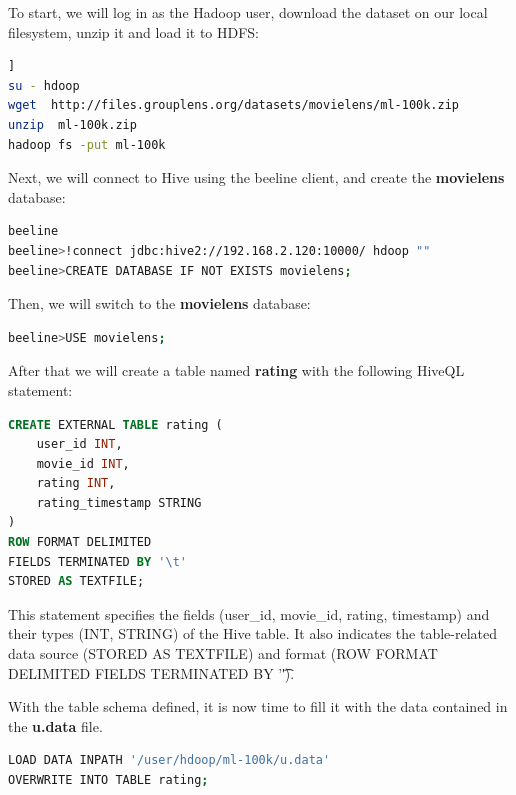 \documentclass[12pt,english]{book}
\begin{document}
To start, we will log in as the Hadoop user, download the dataset on our local filesystem, unzip it and load it to HDFS:

\begin{lstlisting}[language=bash, frame=single, basicstyle=\footnotesize, breaklines=true, postbreak=\mbox{\textcolor{red}{$\hookrightarrow$}\space}]]
su - hdoop
wget  http://files.grouplens.org/datasets/movielens/ml-100k.zip
unzip  ml-100k.zip
hadoop fs -put ml-100k
\end{lstlisting}

Next, we will connect to Hive using the beeline client, and create the \textbf{movielens} database:

\begin{lstlisting}[language=bash, frame=single, basicstyle=\footnotesize]
beeline
beeline>!connect jdbc:hive2://192.168.2.120:10000/ hdoop ""
beeline>CREATE DATABASE IF NOT EXISTS movielens;
\end{lstlisting}

Then, we will switch to the \textbf{movielens} database:

\begin{lstlisting}[language=bash, frame=single, basicstyle=\footnotesize]
beeline>USE movielens;
\end{lstlisting}

After that we will create a table named \textbf{rating} with the following HiveQL statement:

\begin{lstlisting}[language=SQL, frame=single, basicstyle=\footnotesize]
CREATE EXTERNAL TABLE rating (
	user_id INT,
	movie_id INT,
	rating INT,
	rating_timestamp STRING
)
ROW FORMAT DELIMITED 
FIELDS TERMINATED BY '\t'
STORED AS TEXTFILE;
\end{lstlisting}

This statement specifies the fields (user\_id, movie\_id, rating, timestamp) and their types (INT, STRING) of the Hive table.
It also indicates the table-related data source (STORED AS TEXTFILE) and format (ROW FORMAT DELIMITED FIELDS TERMINATED BY '\t').

With the table schema defined, it is now time to fill it with the data contained in the \textbf{u.data} file.

\begin{lstlisting}[language=bash, frame=single, basicstyle=\footnotesize]
LOAD DATA INPATH '/user/hdoop/ml-100k/u.data'
OVERWRITE INTO TABLE rating;
\end{lstlisting}
\end{document}
